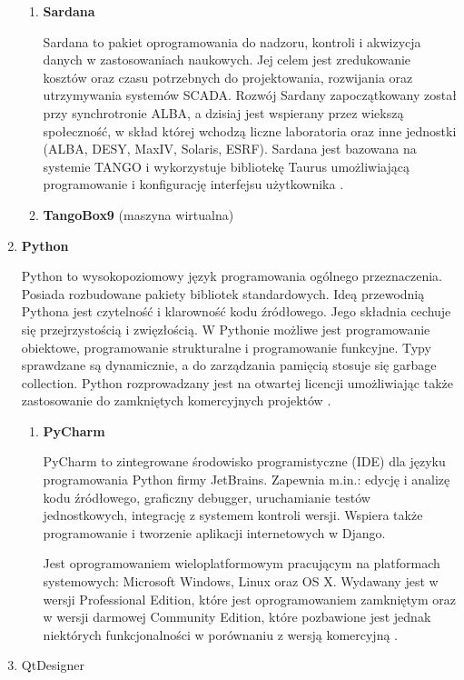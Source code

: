 \begin{enumerate}
\begin{enumerate}
		
		\item \textbf{Sardana}
		
		\hspace{2em}Sardana to pakiet oprogramowania do nadzoru, kontroli i akwizycja danych w zastosowaniach naukowych. Jej celem jest zredukowanie kosztów oraz czasu potrzebnych do projektowania, rozwijania oraz utrzymywania systemów SCADA. Rozwój Sardany zapoczątkowany został przy synchrotronie ALBA, a dzisiaj jest wspierany przez wiekszą społeczność,  w skład której wchodzą liczne laboratoria oraz inne jednostki (ALBA, DESY, MaxIV, Solaris, ESRF).
		Sardana jest bazowana na systemie TANGO i wykorzystuje bibliotekę Taurus umożliwiającą programowanie i konfigurację interfejsu użytkownika \cite{Sardana}.
		
		\item \textbf{TangoBox9} (maszyna wirtualna)
	\end{enumerate}
	\item \textbf{Python}
	
	\hspace{2em}Python to wysokopoziomowy język programowania ogólnego przeznaczenia. Posiada rozbudowane pakiety bibliotek standardowych. Ideą przewodnią Pythona jest czytelność i klarowność kodu źródłowego. Jego składnia cechuje się przejrzystością i zwięzłością. W Pythonie możliwe jest programowanie obiektowe, programowanie strukturalne i programowanie funkcyjne. Typy sprawdzane są dynamicznie, a do zarządzania pamięcią stosuje się garbage collection. Python rozprowadzany jest na otwartej licencji umożliwiając także zastosowanie do zamkniętych komercyjnych projektów \cite{Python}.
	
	\begin{enumerate}
		\item \textbf{PyCharm}
		
		\hspace{2em}PyCharm to zintegrowane środowisko programistyczne (IDE) dla języku programowania Python firmy JetBrains. Zapewnia m.in.: edycję i analizę kodu źródłowego, graficzny debugger, uruchamianie testów jednostkowych, integrację z systemem kontroli wersji. Wspiera także programowanie i tworzenie aplikacji internetowych w Django.
		
		\hspace{2em}Jest oprogramowaniem wieloplatformowym pracującym na platformach systemowych: Microsoft Windows, Linux oraz OS X. Wydawany jest w wersji Professional Edition, które jest oprogramowaniem zamkniętym oraz w wersji darmowej Community Edition, które pozbawione jest jednak niektórych funkcjonalności w porównaniu z wersją komercyjną \cite{PyCharm}.
		
	\end{enumerate}
	\item QtDesigner
\end{enumerate}